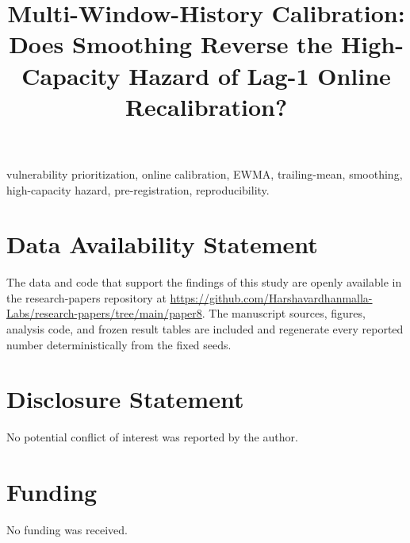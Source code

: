 \documentclass[journal]{IEEEtran}
\title{Multi-Window-History Calibration: Does Smoothing Reverse the
High-Capacity Hazard of Lag-1 Online Recalibration?}
\author{%
  \IEEEauthorblockN{Harshavardhan Malla}
  \IEEEauthorblockA{Independent Researcher\\
  Email: harshavardhanmalla75@gmail.com}%
}
\begin{document}
\maketitle

\begin{abstract}

\end{abstract}

\begin{IEEEkeywords}
vulnerability prioritization, online calibration, EWMA, trailing-mean,
smoothing, high-capacity hazard, pre-registration, reproducibility.
\end{IEEEkeywords}













\section*{Data Availability Statement}
The data and code that support the findings of this study are openly available in the research-papers repository at \url{https://github.com/Harshavardhanmalla-Labs/research-papers/tree/main/paper8}. The manuscript sources, figures, analysis code, and frozen result tables are included and regenerate every reported number deterministically from the fixed seeds.

\section*{Disclosure Statement}
No potential conflict of interest was reported by the author.

\section*{Funding}
No funding was received.
\end{document}
